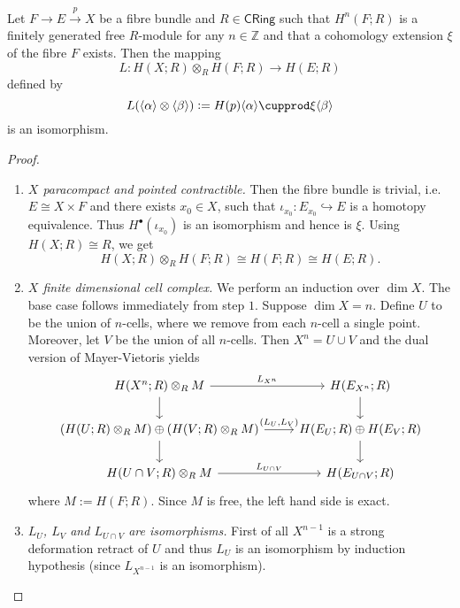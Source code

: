\begin{theorem}	
	\label{thm:LH}
	Let $F \to E \overset{p}{\to} X$ be a fibre bundle and $R \in \mathsf{CRing}$ such that $H^n(F;R)$ is a finitely generated free $R$-module for any $n \in \mathbb{Z}$ and that a cohomology extension $\xi$ of the fibre $F$ exists. Then the mapping
	\begin{equation*}
		L : H(X;R) \otimes_R H(F;R) \to H(E;R)
	\end{equation*}
	\noindent defined by
	\begin{equation*}
		L(\langle \alpha \rangle \otimes \langle \beta \rangle) := H(p)\langle \alpha \rangle \cupprod \xi\langle \beta \rangle
	\end{equation*}
	\noindent is an isomorphism.
\end{theorem}

\begin{proof}
	\begin{enumerate}[label = \textit{Step \arabic*:},wide = 0pt]
		\item \textit{$X$ paracompact and pointed contractible.} Then the fibre bundle is trivial, i.e. $E \cong X \times F$ and there exists $x_0 \in X$, such that $\iota_{x_0} : E_{x_0} \hookrightarrow E$ is a homotopy equivalence. Thus $H^\bullet(\iota_{x_0})$ is an isomorphism and hence is $\xi$. Using $H(X;R) \cong R$, we get
			\begin{equation*}
				H(X;R) \otimes_R H(F;R) \cong H(F;R) \cong H(E;R).
			\end{equation*}
		\item \textit{$X$ finite dimensional cell complex.} We perform an induction over $\dim X$. The base case follows immediately from step $1$. Suppose $ \dim X = n$. Define $U$ to be the union of $n$-cells, where we remove from each $n$-cell a single point. Moreover, let $V$ be the union of all $n$-cells. Then $X^n = U \cup V$ and the dual version of Mayer-Vietoris yields
			\begin{equation*}
				\begin{tikzcd}
					H(X^n;R) \otimes_R M \arrow[r,"L_{X^n}"]\arrow[d] & H(E_{X^n};R)\arrow[d]\\
					(H(U;R) \otimes_R M) \oplus (H(V;R) \otimes_R M) \arrow[r,"{(L_U,L_V)}"]\arrow[d] & H(E_U;R) \oplus H(E_V;R)\arrow[d]\\
					H(U \cap V;R) \otimes_R M \arrow[r,"L_{U \cap V}"] & H(E_{U \cap V};R)
				\end{tikzcd}
			\end{equation*}
			\noindent where $M := H(F;R)$. Since $M$ is free, the left hand side is exact.
		\item \textit{$L_U$, $L_V$ and $L_{U \cap V}$ are isomorphisms.} First of all $X^{n - 1}$ is a strong deformation retract of $U$ and thus $L_U$ is an isomorphism by induction hypothesis (since $L_{X^{n - 1}}$ is an isomorphism).
	\end{enumerate}
\end{proof}

